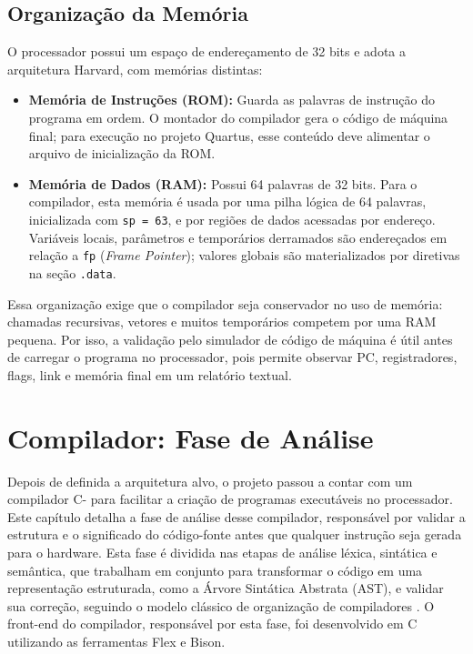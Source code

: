 \documentclass[
	12pt,				%
	oneside,
	a4paper,			%
	english,			%
	french,				%
	spanish,			%
	brazil,				%
	]{abntex2}
\begin{document}
\section{Organização da Memória}

O processador possui um espaço de endereçamento de 32 bits e adota a arquitetura Harvard, com memórias distintas:
\begin{itemize}
    \item \textbf{Memória de Instruções (ROM):} Guarda as palavras de instrução do programa em ordem. O montador do compilador gera o código de máquina final; para execução no projeto Quartus, esse conteúdo deve alimentar o arquivo de inicialização da ROM.
    \item \textbf{Memória de Dados (RAM):} Possui 64 palavras de 32 bits. Para o compilador, esta memória é usada por uma pilha lógica de 64 palavras, inicializada com \texttt{sp = 63}, e por regiões de dados acessadas por endereço. Variáveis locais, parâmetros e temporários derramados são endereçados em relação a \texttt{fp} (\emph{Frame Pointer}); valores globais são materializados por diretivas na seção \texttt{.data}.
\end{itemize}

Essa organização exige que o compilador seja conservador no uso de memória: chamadas recursivas, vetores e muitos temporários competem por uma RAM pequena. Por isso, a validação pelo simulador de código de máquina é útil antes de carregar o programa no processador, pois permite observar PC, registradores, flags, link e memória final em um relatório textual.

\chapter{Compilador: Fase de Análise}
\label{cap:analise}

Depois de definida a arquitetura alvo, o projeto passou a contar com um compilador C- para facilitar a criação de programas executáveis no processador. Este capítulo detalha a fase de análise desse compilador, responsável por validar a estrutura e o significado do código-fonte antes que qualquer instrução seja gerada para o hardware. Esta fase é dividida nas etapas de análise léxica, sintática e semântica, que trabalham em conjunto para transformar o código em uma representação estruturada, como a Árvore Sintática Abstrata (AST), e validar sua correção, seguindo o modelo clássico de organização de compiladores \cite{compiladoresLouden}. O front-end do compilador, responsável por esta fase, foi desenvolvido em C utilizando as ferramentas Flex e Bison.
\end{document}
